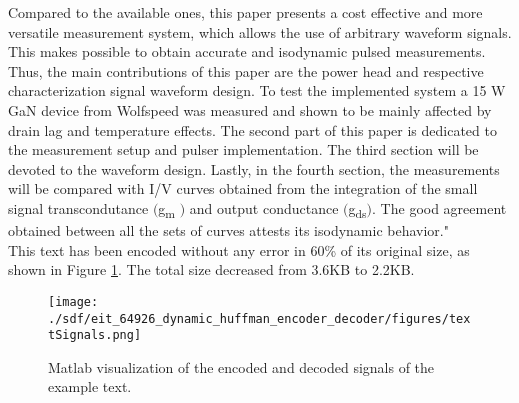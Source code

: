 \begin{refsection}
{Compared to the available ones, this paper presents a cost effective and more versatile measurement system, which allows the use of arbitrary waveform signals. This makes possible to obtain accurate and isodynamic pulsed measurements. Thus, the main contributions of this paper are the power head and respective characterization signal waveform design. To test the implemented system a 15 W GaN device from Wolfspeed was measured and shown to be mainly affected by drain lag and temperature effects. The second part of this paper is dedicated to the measurement setup and pulser implementation. The third section will be devoted to the waveform design. Lastly, in the fourth section, the measurements will be compared with I/V curves obtained from the integration of the small signal transcondutance $($g\textsubscript{m} $)$ and output conductance $($g\textsubscript{ds}$)$. The good agreement obtained between all the sets of curves attests its isodynamic behavior."}\\

This text has been encoded without any error in 60\% of its original size, as shown in Figure \ref{fig:encodedtext}. The total size decreased from 3.6KB to 2.2KB.

\begin{figure}[H]
	\centering
	\texttt{[image: ./sdf/eit\_64926\_dynamic\_huffman\_encoder\_decoder/figures/textSignals.png]}
	\caption{Matlab visualization of the encoded and decoded signals of the example text.}\label{fig:encodedtext}
\end{figure}

\newpage
\clearpage
\printbibliography[heading=subbibliography]
\end{refsection}
\cleardoublepage 